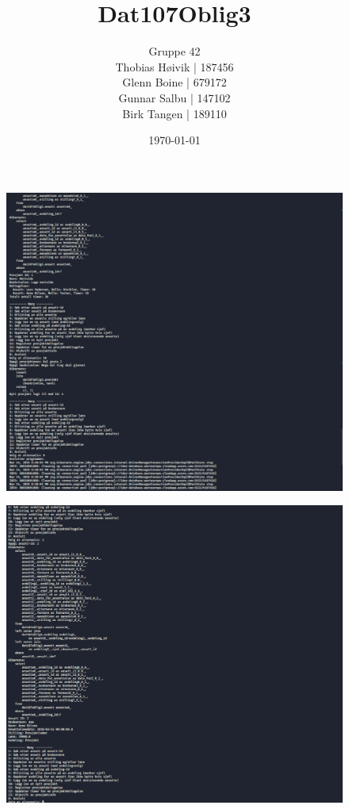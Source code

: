 \documentclass[12pt]{article}
\title{Dat107Oblig3}
\author{ Gruppe 42 \\
        Thobias Høivik | 187456 \\ 
        Glenn Boine | 679172 \\
        Gunnar Salbu | 147102 \\ 
        Birk Tangen | 189110
}
\date{\today}
\begin{document}
\maketitle
\begin{figure}[ht]
    \centering
    \includegraphics[width=1\textwidth]{./img/Running1.PNG}
\end{figure}
\begin{figure}[ht]
    \centering
    \includegraphics[width=1\textwidth]{./img/Running2.PNG}
\end{figure}
\end{document}
